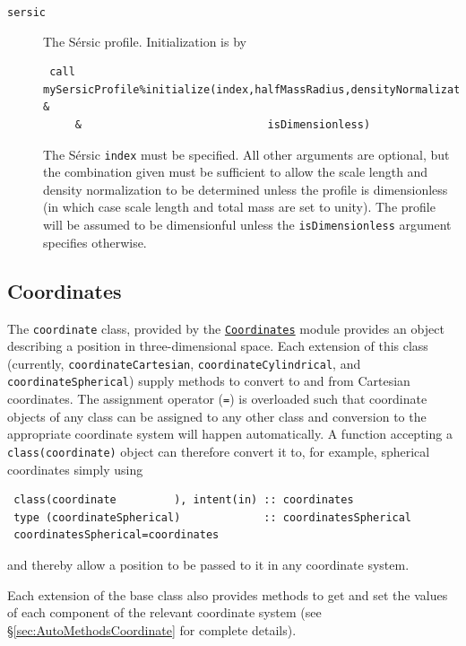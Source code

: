 \begin{description}
 \item [{\tt sersic}] The S\'ersic \citep{sersic_influence_1963} profile. Initialization is by
\begin{verbatim}
 call mySersicProfile%initialize(index,halfMassRadius,densityNormalization,mass, &
     &                             isDimensionless)
\end{verbatim}
The S\'ersic {\tt index} must be specified. All other arguments are optional, but the combination given must be sufficient to allow the scale length and density normalization to be determined unless the profile is dimensionless (in which case scale length and total mass are set to unity). The profile will be assumed to be dimensionful unless the {\tt isDimensionless} argument specifies otherwise.
\end{description}

\subsection{Coordinates}\label{sec:Coordinates}

The {\tt coordinate} class, provided by the \hyperlink{objects.coordinates.F90:coordinates}{\tt Coordinates} module provides an object describing a position in three-dimensional space. Each extension of this class (currently, {\tt coordinateCartesian}, {\tt coordinateCylindrical}, and {\tt coordinateSpherical}) supply methods to convert to and from Cartesian coordinates. The assignment operator ({\tt =}) is overloaded such that coordinate objects of any class can be assigned to any other class and conversion to the appropriate coordinate system will happen automatically. A function accepting a {\tt class(coordinate)} object can therefore convert it to, for example, spherical coordinates simply using
\begin{verbatim}
 class(coordinate         ), intent(in) :: coordinates
 type (coordinateSpherical)             :: coordinatesSpherical
 coordinatesSpherical=coordinates
\end{verbatim}
and thereby allow a position to be passed to it in any coordinate system.

Each extension of the base class also provides methods to get and set the values of each component of the relevant coordinate system (see \S\ref{sec:AutoMethodsCoordinate} for complete details).
